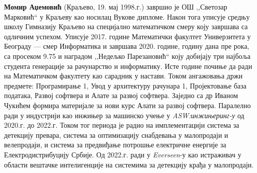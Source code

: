 \documentclass[11pt,oneside]{memoir}
\begin{document}



\begin{biografija}
  \textbf{Момир Аџемовић} (Краљево, 19. мај 1998.г.) завршио је ОШ ,,Светозар Марковић`` у Краљеву као носилац Вукове дипломе. Након
  тога уписује средњу школу Гимназију Краљево на специјално математичком смеру коју завршава са одличним успехом. Уписује 2017.
  године Математички факултет Универзитета у Београду --- смер Информатика и завршава 2020. године, годину дана пре рока, са просеком
  9.75 и наградом ,,Недељко Парезановић`` коју добијају три најбоља студента генерације за рачунарство и информатику. Исте године
  почиње да ради на Математичком факултету као сарадник у настави. Током ангажовања држи предмете: Програмирање 1, Увод у архитектуру
  рачунара 1, Пројектовање база података, Развој софтвера и Алате за развој софтвера. Заједно са др Иваном Чукићем формира
  материјале за нови курс Алати за развој софтвера. Паралелно ради у индустрији као инжињер за машинско учење 
  у \textit{ASW:инжињеринг-у} од 2020.г. до 2022.г. Током тог периода је радио на имплементацији система за детекцију превара,
  система за оптимизацију снабдевања у малопродаји и велепродаји, и система за предвиђање потрошње електричне енергије за Електродистрибуцију
  Србије. Од 2022.г. ради у \textit{Everseen}-у као истраживач у области вештачке интелигенције на системима за детекцију крађа
  у малопродаји.
  \end{biografija}
\end{document}
